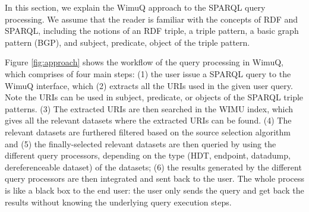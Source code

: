 In this section, we explain the WimuQ approach to the SPARQL query processing. We assume that the reader is familiar with the concepts of RDF and SPARQL, including the notions of an RDF triple, a triple pattern, a basic graph pattern (BGP), and subject, predicate, object of the triple pattern. 




Figure \ref{fig:approach} shows the workflow of the query processing in WimuQ, which comprises of four main steps: (1) the user issue a SPARQL query to the WimuQ interface, which (2) extracts all the URIs used in the given user query. Note the URIs can be used in subject, predicate, or objects of the SPARQL triple patterns. (3) The extracted URIs are then searched in the WIMU index, which gives all the relevant datasets where the extracted URIs can be found. (4) The relevant datasets are furthered filtered based on the source selection algorithm and (5) the finally-selected relevant datasets are then queried by using the different query processors, depending on the type (HDT, endpoint, datadump, dereferenceable dataset) of the datasets; (6) the results generated by the different query processors are then integrated and sent back to the user. The whole process is like a black box to the end user: the user only sends the query and get back the results without knowing the underlying query execution steps. %


